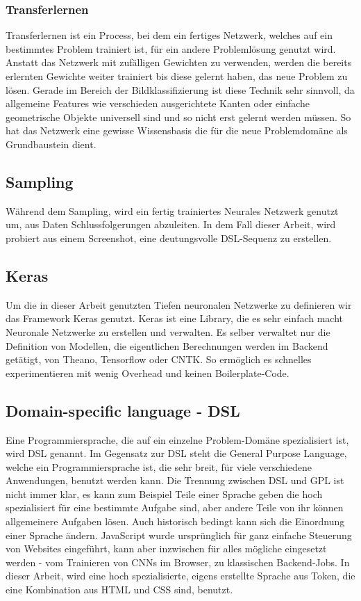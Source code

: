 \documentclass[pdftex,a4paper,halfparskip, article]{scrartcl}
\begin{document}
\subsubsection{Transferlernen}

Transferlernen ist ein Process, bei dem ein fertiges Netzwerk, welches auf ein bestimmtes Problem trainiert ist, für ein andere Problemlösung genutzt wird. Anstatt das Netzwerk mit zufälligen Gewichten zu verwenden, werden die bereits erlernten Gewichte weiter trainiert bis diese gelernt haben, das neue Problem zu lösen. Gerade im Bereich der Bildklassifizierung ist diese Technik sehr sinnvoll, da allgemeine Features wie verschieden ausgerichtete Kanten oder einfache geometrische Objekte universell sind und so nicht erst gelernt werden müssen. So hat das Netzwerk eine gewisse Wissensbasis die für die neue Problemdomäne als Grundbaustein dient.

\subsection{Sampling}
Während dem Sampling, wird ein fertig trainiertes Neurales Netzwerk genutzt um, aus Daten Schlussfolgerungen abzuleiten. In dem Fall dieser Arbeit, wird probiert aus einem Screenshot, eine deutungsvolle DSL-Sequenz zu erstellen.

\subsection{Keras}
Um die in dieser Arbeit genutzten Tiefen neuronalen Netzwerke zu definieren wir das Framework Keras \cite{chollet2015keras} genutzt. Keras ist eine Library, die es sehr einfach macht Neuronale Netzwerke zu erstellen und verwalten. Es selber verwaltet nur die Definition von Modellen, die eigentlichen Berechnungen werden im Backend getätigt, von Theano, Tensorflow oder CNTK. So ermöglich es schnelles experimentieren mit wenig Overhead und keinen Boilerplate-Code. 

\subsection{Domain-specific language - DSL}

Eine Programmiersprache, die auf ein einzelne Problem-Domäne spezialisiert ist, wird DSL genannt. Im Gegensatz zur DSL steht die General Purpose Language, welche ein Programmiersprache ist, die sehr breit, für viele verschiedene Anwendungen, benutzt werden kann. Die Trennung zwischen DSL und GPL ist nicht immer klar, es kann zum Beispiel Teile einer Sprache geben die hoch spezialisiert für eine bestimmte Aufgabe sind, aber andere Teile von ihr können allgemeinere Aufgaben lösen. Auch historisch bedingt kann sich die Einordnung einer Sprache ändern. JavaScript wurde ursprünglich für ganz einfache Steuerung von Websites eingeführt, kann aber inzwischen für alles mögliche eingesetzt werden - vom Trainieren von CNNs im Browser, zu klassischen Backend-Jobs. 
In dieser Arbeit, wird eine hoch spezialisierte, eigens erstellte Sprache aus Token, die eine Kombination aus HTML und CSS sind, benutzt.
\end{document}
